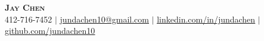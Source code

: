 
\begin{center}
    \textbf{\Huge \scshape Jay Chen} \\ \vspace{1pt}
    \small 412-716-7452 $|$ \href{mailto:x@x.com}{\underline{jundachen10@gmail.com}} $|$ 
    \href{https://linkedin.com/in/jundachen}{\underline{linkedin.com/in/jundachen}} $|$
    \href{https://github.com/jundachen10}{\underline{github.com/jundachen10}}
\end{center}